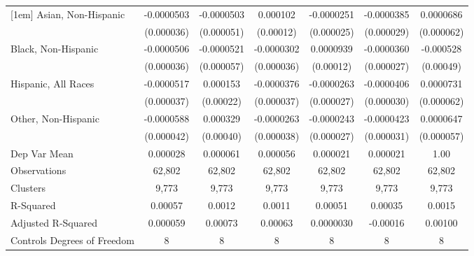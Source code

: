 \begin{table}[htbp]
\begin{tabular}{l*{6}{c}}
[1em]
Asian, Non-Hispanic&  -0.0000503         &  -0.0000503         &    0.000102         &  -0.0000251         &  -0.0000385         &   0.0000686         \\
  &  (0.000036)         &  (0.000051)         &   (0.00012)         &  (0.000025)         &  (0.000029)         &  (0.000062)         \\
[1em]
Black, Non-Hispanic&  -0.0000506         &  -0.0000521         &  -0.0000302         &   0.0000939         &  -0.0000360         &   -0.000528         \\
  &  (0.000036)         &  (0.000057)         &  (0.000036)         &   (0.00012)         &  (0.000027)         &   (0.00049)         \\
[1em]
Hispanic, All Races&  -0.0000517         &    0.000153         &  -0.0000376         &  -0.0000263         &  -0.0000406         &   0.0000731         \\
  &  (0.000037)         &   (0.00022)         &  (0.000037)         &  (0.000027)         &  (0.000030)         &  (0.000062)         \\
[1em]
Other, Non-Hispanic&  -0.0000588         &    0.000329         &  -0.0000263         &  -0.0000243         &  -0.0000423         &   0.0000647         \\
  &  (0.000042)         &   (0.00040)         &  (0.000038)         &  (0.000027)         &  (0.000031)         &  (0.000057)         \\
\hline
Dep Var Mean&    0.000028         &    0.000061         &    0.000056         &    0.000021         &    0.000021         &        1.00         \\
Observations&      62,802         &      62,802         &      62,802         &      62,802         &      62,802         &      62,802         \\
Clusters&       9,773         &       9,773         &       9,773         &       9,773         &       9,773         &       9,773         \\
R-Squared&     0.00057         &      0.0012         &      0.0011         &     0.00051         &     0.00035         &      0.0015         \\
Adjusted R-Squared&    0.000059         &     0.00073         &     0.00063         &   0.0000030         &    -0.00016         &     0.00100         \\
Controls Degrees of Freedom&           8         &           8         &           8         &           8         &           8         &           8         \\

\end{tabular}
\end{table}
